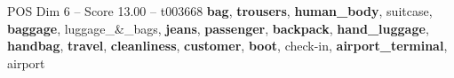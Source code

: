 \begin{textsample}{POS Dim 6 – Score 13.00 – t003668}  \label{ex:f6_pos_018}
\textbf{bag}, \textbf{trousers}, \textbf{human\_body}, suitcase, \textbf{baggage}, luggage\_\&\_bags, \textbf{jeans}, \textbf{passenger}, \textbf{backpack}, \textbf{hand\_luggage}, \textbf{handbag}, \textbf{travel}, \textbf{cleanliness}, \textbf{customer}, \textbf{boot}, check-in, \textbf{airport\_terminal}, airport

\end{textsample}
